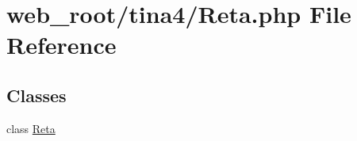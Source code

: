 \hypertarget{Reta_8php}{}\section{web\+\_\+root/tina4/\+Reta.php File Reference}
\label{Reta_8php}
\subsection*{Classes}
\begin{DoxyCompactItemize}
\item 
class \hyperlink{classReta}{Reta}
\end{DoxyCompactItemize}
